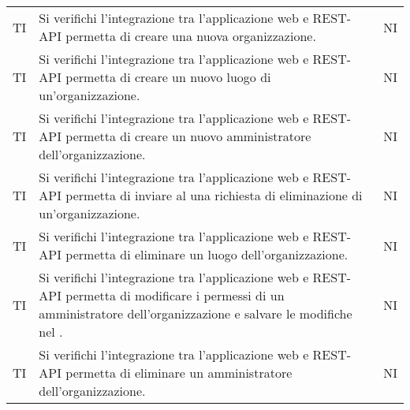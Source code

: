 {\begin{longtable}{ c C{8.5cm} C{1cm}}
TI & Si verifichi l’integrazione tra l’applicazione web e REST-API permetta di creare una nuova organizzazione.& NI \\
TI & Si verifichi l’integrazione tra l’applicazione web e REST-API permetta di creare un nuovo luogo di un’organizzazione.& NI \\
TI & Si verifichi l’integrazione tra l’applicazione web e REST-API permetta di creare un nuovo amministratore dell’organizzazione.& NI \\
TI & Si verifichi l’integrazione tra l’applicazione web e REST-API permetta di inviare al  una richiesta di eliminazione di un’organizzazione.& NI \\
TI & Si verifichi l’integrazione tra l’applicazione web e REST-API permetta di eliminare un luogo dell’organizzazione.& NI \\
TI & Si verifichi l’integrazione tra l’applicazione web e REST-API permetta di modificare i permessi di un amministratore dell’organizzazione e salvare le modifiche nel .& NI \\
TI & Si verifichi l’integrazione tra l’applicazione web e REST-API permetta di eliminare un amministratore dell’organizzazione.& NI \\




\end{longtable}
}